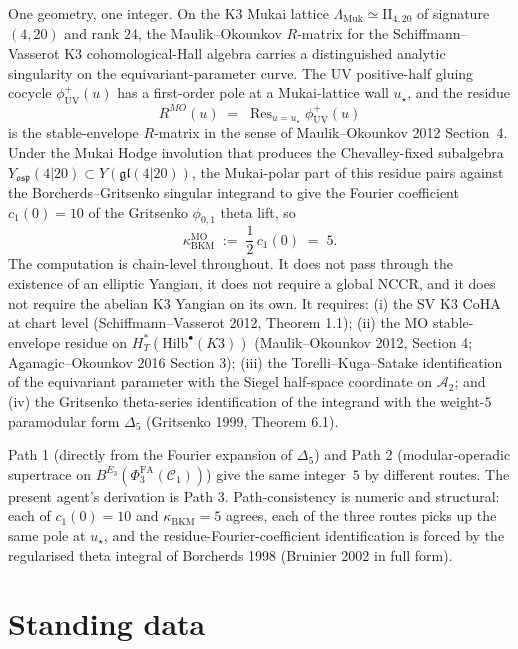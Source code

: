One geometry, one integer.  On the K3 Mukai lattice
$\Lambda_{\mathrm{Muk}} \simeq \mathrm{II}_{4,20}$ of signature $(4,20)$
and rank $24$, the Maulik--Okounkov $R$-matrix for the Schiffmann--
Vasserot K3 cohomological-Hall algebra carries a distinguished
analytic singularity on the equivariant-parameter curve.  The UV
positive-half gluing cocycle
$\phi^+_{\mathrm{UV}}(u)$ has a first-order pole at a Mukai-lattice
wall $u_{\star}$, and the residue
\[
   R^{MO}(u) \;=\; \mathop{\mathrm{Res}}_{u = u_{\star}}
      \phi^+_{\mathrm{UV}}(u)
\]
is the stable-envelope $R$-matrix in the sense of Maulik--Okounkov
2012 Section~4.  Under the Mukai Hodge involution that produces the
Chevalley-fixed subalgebra $Y_{\mathfrak{osp}}(4|20) \subset
Y(\mathfrak{gl}(4|20))$, the Mukai-polar part of this residue pairs
against the Borcherds--Gritsenko singular integrand to give the
Fourier coefficient $c_1(0) = 10$ of the Gritsenko $\phi_{0,1}$ theta
lift, so
\[
   \kappa_{\mathrm{BKM}}^{\mathrm{MO}}
     \;:=\; \frac{1}{2}\, c_1(0) \;=\; 5.
\]
The computation is chain-level throughout.  It does not pass through
the existence of an elliptic Yangian, it does not require a global
NCCR, and it does not require the abelian K3 Yangian on its own.  It
requires: (i) the SV K3 CoHA at chart level
(Schiffmann--Vasserot 2012, Theorem 1.1); (ii) the MO stable-envelope
residue on $H^{*}_{T}(\mathrm{Hilb}^{\bullet}(K3))$
(Maulik--Okounkov 2012, Section 4; Aganagic--Okounkov 2016
Section 3); (iii) the Torelli--Kuga--Satake identification of the
equivariant parameter with the Siegel half-space coordinate on
$\mathcal A_2$; and (iv) the Gritsenko theta-series identification
of the integrand with the weight-$5$ paramodular form $\Delta_5$
(Gritsenko 1999, Theorem 6.1).

Path 1 (directly from the Fourier expansion of $\Delta_5$) and
Path 2 (modular-operadic supertrace on
$B^{E_3}(\Phi_{3}^{\mathrm{FA}}(\mathcal C_1))$) give the same
integer~$5$ by different routes.  The present agent's derivation is
Path 3.  Path-consistency is numeric and structural: each of
$c_1(0) = 10$ and $\kappa_{\mathrm{BKM}} = 5$ agrees, each of the
three routes picks up the same pole at $u_{\star}$, and the
residue-Fourier-coefficient identification is forced by the
regularised theta integral of Borcherds 1998 (Bruinier 2002 in
full form).

\section*{Standing data}

